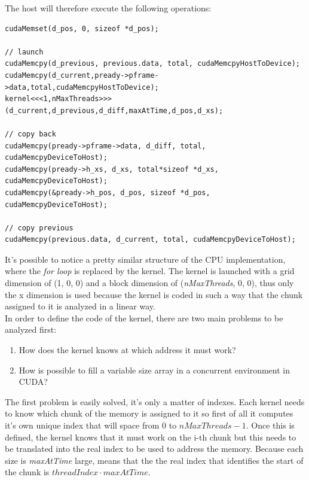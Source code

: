 \documentclass[paper=a4, fontsize=10pt]{scrartcl}	%
\begin{document}
	The host will therefore execute the following operations:

	\begin{lstlisting}[style=CStyle]
cudaMemset(d_pos, 0, sizeof *d_pos);

// launch
cudaMemcpy(d_previous, previous.data, total, cudaMemcpyHostToDevice);
cudaMemcpy(d_current,pready->pframe->data,total,cudaMemcpyHostToDevice);
kernel<<<1,nMaxThreads>>>(d_current,d_previous,d_diff,maxAtTime,d_pos,d_xs);

// copy back
cudaMemcpy(pready->pframe->data, d_diff, total, cudaMemcpyDeviceToHost);
cudaMemcpy(pready->h_xs, d_xs, total*sizeof *d_xs, cudaMemcpyDeviceToHost);
cudaMemcpy(&pready->h_pos, d_pos, sizeof *d_pos, cudaMemcpyDeviceToHost);

// copy previous
cudaMemcpy(previous.data, d_current, total, cudaMemcpyDeviceToHost);
	\end{lstlisting}

	It's possible to notice a pretty similar structure of the CPU implementation, where the \textit{for loop} is replaced by the kernel. The kernel is launched with a grid dimension of (1, 0, 0) and a block dimension of (\textit{nMaxThreads}, 0, 0), thus only the x dimension is used because the kernel is coded in such a way that the chunk assigned to it is analyzed in a linear way. \\
	
	In order to define the code of the kernel, there are two main problems to be analyzed first:

	\begin{enumerate}
		\itemsep0sp
		\item How does the kernel knows at which address it must work?
		\item How is possible to fill a variable size array in a concurrent environment in CUDA?
	\end{enumerate}

	The first problem is easily solved, it's only a matter of indexes. Each kernel needs to know which chunk of the memory is assigned to it so first of all it computes it's own unique index that will space from 0 to $nMaxThreads - 1$. Once this is defined, the kernel knows that it must work on the i-th chunk but this needs to be translated into the real index to be used to address the memory. Because each size is \textit{maxAtTime} large, means that the the real index that identifies the start of the chunk is $ threadIndex \cdot maxAtTime$.\\
\end{document}
